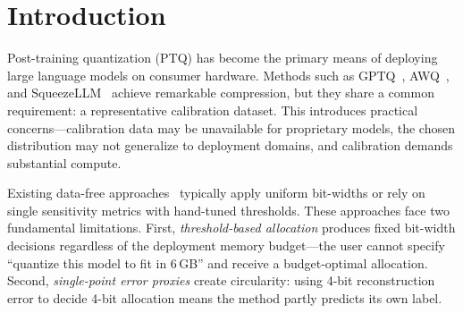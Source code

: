 \documentclass{article}
\begin{document}
\begin{abstract}
bits) despite continued PPL improvement, establishing perplexity as the appropriate primary metric for quantization evaluation. We also demonstrate that standard mean perplexity can be misleading due to outlier sequences, and recommend reporting median perplexity and tail statistics alongside standard corpus perplexity. The entire pipeline requires no calibration data, no gradient computation, and completes in under 50 minutes on commodity hardware. Code is available at \url{https://github.com/baa-ai/MINT} and pre-quantized models at \url{https://huggingface.co/baa-ai}.
\end{abstract}

\section{Introduction}
\label{sec:intro}

Post-training quantization (PTQ) has become the primary means of deploying large language models on consumer hardware. Methods such as GPTQ~\cite{frantar2023gptq}, AWQ~\cite{lin2024awq}, and SqueezeLLM~\cite{kim2024squeezellm} achieve remarkable compression, but they share a common requirement: a representative calibration dataset. This introduces practical concerns---calibration data may be unavailable for proprietary models, the chosen distribution may not generalize to deployment domains, and calibration demands substantial compute.

Existing data-free approaches~\cite{tang2024easyquant,zhang2025mxq,badri2024hqq} typically apply uniform bit-widths or rely on single sensitivity metrics with hand-tuned thresholds. These approaches face two fundamental limitations. First, \emph{threshold-based allocation} produces fixed bit-width decisions regardless of the deployment memory budget---the user cannot specify ``quantize this model to fit in 6\,GB'' and receive a budget-optimal allocation. Second, \emph{single-point error proxies} create circularity: using 4-bit reconstruction error to decide 4-bit allocation means the method partly predicts its own label.
\end{document}
